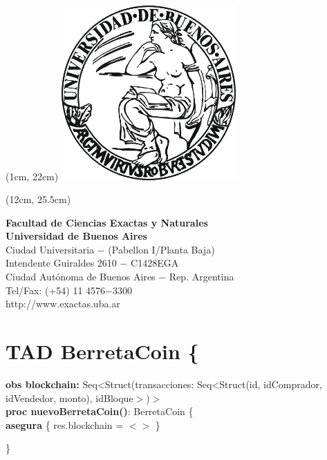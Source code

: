 \documentclass{article}
\begin{document}
\begin{textblock*}{17cm} (1cm, 22cm)
    {
    \includegraphics[width=0.5\textwidth]{uba_logo.jpg}
    }
\end{textblock*}

\begin{textblock*}{20cm} (12cm, 25.5cm)
    {\raggedright\textbf{Facultad de Ciencias Exactas y Naturales}\\
    \textbf{Universidad de Buenos Aires}\\
    Ciudad Universitaria $-$ (Pabellon I/Planta Baja)\\
    Intendente Guiraldes 2610 $-$ C1428EGA\\
    Ciudad Autónoma de Buenos Aires $-$ Rep. Argentina\\
    Tel/Fax: (+54) 11 4576$-$3300\\
    http://www.exactas.uba.ar
    }
\end{textblock*}



\newpage
\setcounter{page}{1}
\section*{TAD \textdollar BerretaCoin \{}
    \textbf{obs blockchain:} Seq\textless Struct(transacciones: Seq\textless Struct(id, idComprador,
                             idVendedor, monto), idBloque$>$)$>$\\

    \textbf{proc nuevoBerretaCoin()}: BerretaCoin \{\\
        \indent\indent \textbf{asegura} \{ res.blockchain = $<>$ \}

    \}\\\\
\end{document}
